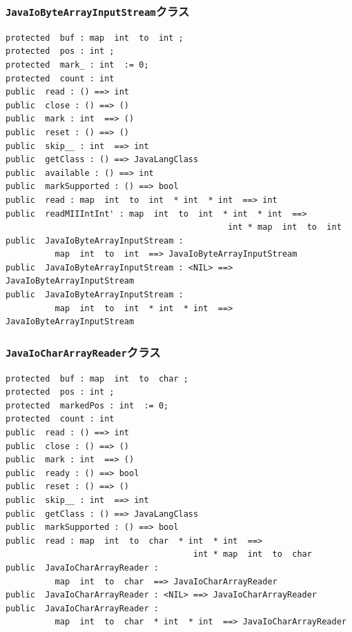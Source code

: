 \documentclass[\pformat,12pt]{jarticle}
\begin{document}
\subsubsection{\texttt{JavaIoByteArrayInputStream}クラス}
\begin{small}
\begin{verbatim}
protected  buf : map  int  to  int ;
protected  pos : int ;
protected  mark_ : int  := 0;
protected  count : int
public  read : () ==> int
public  close : () ==> ()
public  mark : int  ==> ()
public  reset : () ==> ()
public  skip__ : int  ==> int
public  getClass : () ==> JavaLangClass
public  available : () ==> int
public  markSupported : () ==> bool
public  read : map  int  to  int  * int  * int  ==> int
public  readMIIIntInt' : map  int  to  int  * int  * int  ==> 
                                             int * map  int  to  int
public  JavaIoByteArrayInputStream : 
          map  int  to  int  ==> JavaIoByteArrayInputStream
public  JavaIoByteArrayInputStream : <NIL> ==> JavaIoByteArrayInputStream
public  JavaIoByteArrayInputStream : 
          map  int  to  int  * int  * int  ==> JavaIoByteArrayInputStream
\end{verbatim}
\end{small}

\subsubsection{\texttt{JavaIoCharArrayReader}クラス}
\begin{small}
\begin{verbatim}
protected  buf : map  int  to  char ;
protected  pos : int ;
protected  markedPos : int  := 0;
protected  count : int
public  read : () ==> int
public  close : () ==> ()
public  mark : int  ==> ()
public  ready : () ==> bool
public  reset : () ==> ()
public  skip__ : int  ==> int
public  getClass : () ==> JavaLangClass
public  markSupported : () ==> bool
public  read : map  int  to  char  * int  * int  ==> 
                                      int * map  int  to  char
public  JavaIoCharArrayReader : 
          map  int  to  char  ==> JavaIoCharArrayReader
public  JavaIoCharArrayReader : <NIL> ==> JavaIoCharArrayReader
public  JavaIoCharArrayReader : 
          map  int  to  char  * int  * int  ==> JavaIoCharArrayReader
\end{verbatim}
\end{small}
\end{document}
